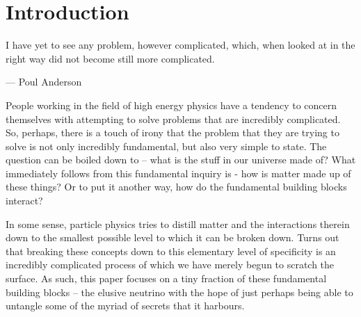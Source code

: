 \section{Introduction}

I have yet to see any problem, however complicated, which, when looked at in the right way did not become still more complicated.

\begin{flushright}--- Poul Anderson\end{flushright}

People working in the field of high energy physics have a tendency to concern themselves with attempting to solve problems that are incredibly complicated.
So, perhaps, there is a touch of irony that the problem that they are trying to solve is not only incredibly fundamental, but also very simple to state.
The question can be boiled down to -- what is the stuff in our universe made of?
What immediately follows from this fundamental inquiry is - how is matter made up of these things? Or to put it another way, how do the fundamental building blocks interact?

In some sense, particle physics tries to distill matter and the interactions therein down to the smallest possible level to which it can be broken down.
Turns out that breaking these concepts down to this elementary level of specificity is an incredibly complicated process of which we have merely begun to scratch the surface.  As such, this paper focuses on a tiny fraction of these fundamental building blocks -- the elusive neutrino with the hope of just perhaps being able to untangle some of the myriad of secrets that it harbours.



% 

% 

% 

% 

% 

% 

% 

% 











